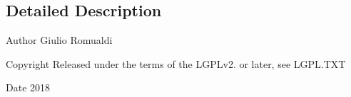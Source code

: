 \subsection{Detailed Description}
\begin{DoxyAuthor}{Author}
Giulio Romualdi 
\end{DoxyAuthor}
\begin{DoxyCopyright}{Copyright}
Released under the terms of the L\+G\+P\+Lv2. or later, see L\+G\+P\+L.\+T\+XT 
\end{DoxyCopyright}
\begin{DoxyDate}{Date}
2018 
\end{DoxyDate}
